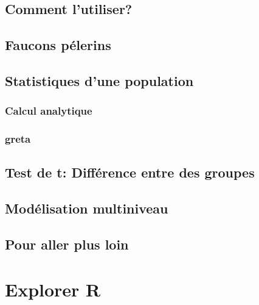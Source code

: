 \documentclass[]{book}
\begin{document}
\hypertarget{comment-lutiliser}{%
\section{Comment l'utiliser?}\label{comment-lutiliser}}

\hypertarget{faucons-puxe9lerins}{%
\section{Faucons pélerins}\label{faucons-puxe9lerins}}

\hypertarget{statistiques-dune-population}{%
\section{Statistiques d'une
population}\label{statistiques-dune-population}}

\hypertarget{calcul-analytique}{%
\subsection{Calcul analytique}\label{calcul-analytique}}

\hypertarget{greta}{%
\subsection{greta}\label{greta}}

\hypertarget{test-de-t-diffuxe9rence-entre-des-groupes}{%
\section{Test de t: Différence entre des
groupes}\label{test-de-t-diffuxe9rence-entre-des-groupes}}

\hypertarget{moduxe9lisation-multiniveau}{%
\section{Modélisation multiniveau}\label{moduxe9lisation-multiniveau}}

\hypertarget{pour-aller-plus-loin}{%
\section{Pour aller plus loin}\label{pour-aller-plus-loin}}

\hypertarget{chapitre-explorer}{%
\chapter{Explorer R}\label{chapitre-explorer}}
\end{document}
